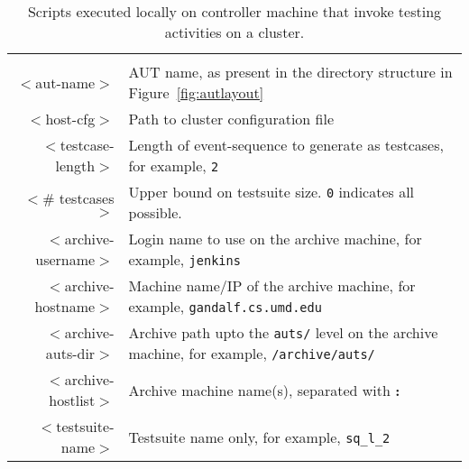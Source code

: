 \begin{table*}
{   \begin{tabular}{rl}
   & \\
   $<$aut-name$>$            & AUT name, as present in the directory structure in Figure~\ref{fig:autlayout} \\
   $<$host-cfg$>$            & Path to cluster configuration file \\
   $<$testcase-length$>$     & Length of event-sequence to generate as testcases, for example, \texttt{2} \\
   $<$\# testcases$>$         & Upper bound on testsuite size. \texttt{0} indicates all possible. \\
   $<$archive-username$>$    & Login name to use on the archive machine, for example, \texttt{jenkins} \\
   $<$archive-hostname$>$    & Machine name/IP of the archive machine, for example, \texttt{gandalf.cs.umd.edu} \\
   $<$archive-auts-dir$>$    & Archive path upto the \texttt{auts/} level on the archive machine, for example, \texttt{/archive/auts/} \\
   $<$archive-hostlist$>$    & Archive machine name(s), separated with \textbf{:} \\
   $<$testsuite-name$>$      & Testsuite name only, for example, \texttt{sq\_l\_2}
  
   \end{tabular}

   }

   \caption{Scripts executed locally on controller machine that invoke testing activities on a cluster.}
   \label{table:clusterscripts}
\end{table*}

